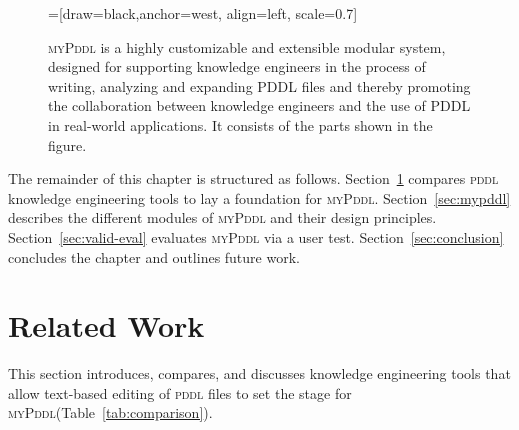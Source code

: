 \documentclass[runningheads]{llncs}
\newcommand{\mypddl}{\textsc{myPddl}\xspace}
\newcommand{\pddl}{\textsc{pddl}\xspace}
\begin{document}
\begin{figure}[H]
  \centering
  =[draw=black,anchor=west,
  align=left,
  scale=0.7]
    \caption{\mypddl is a highly customizable and extensible modular
    system, designed for supporting knowledge engineers in the process
    of writing, analyzing and expanding PDDL files and thereby
    promoting the collaboration between knowledge engineers and the
    use of PDDL in real-world applications. It consists of the parts
    shown in the figure.}
  \label{fig:mypddl-overview}  
\end{figure}

The remainder of this chapter is structured as
follows. Section~\ref{sec:related-work} compares \pddl knowledge
engineering tools to lay a foundation for
\mypddl. Section~\ref{sec:mypddl} describes the different modules of
\mypddl and their design principles. Section~\ref{sec:valid-eval}
evaluates \mypddl via a user test. Section~\ref{sec:conclusion}
concludes the chapter and outlines future work.

\section{Related Work}
\label{sec:related-work}

This section introduces, compares, and discusses knowledge engineering
tools that allow text-based editing of \textsc{pddl} files to set the
stage for \mypddl (Table~\ref{tab:comparison}).
\end{document}
